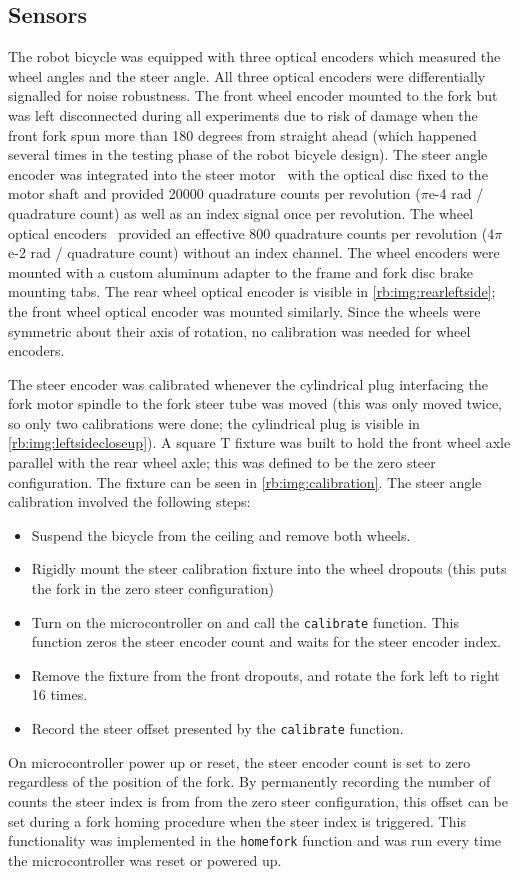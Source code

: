 \subsection{Sensors} \label{rb:subsec:sensors}
The robot bicycle was equipped with three optical encoders which measured the
wheel angles and the steer angle. All three optical encoders were
differentially signalled for noise robustness. The front wheel encoder mounted
to the fork but was left disconnected during all experiments due to risk of
damage when the front fork spun more than 180 degrees from straight ahead
(which happened several times in the testing phase of the robot bicycle
design). The steer angle encoder was integrated into the steer
motor~\cite{TeknicM3441} with the optical disc fixed to the motor shaft and
provided 20000 quadrature counts per revolution ($\pi$e-4 rad / quadrature
count) as well as an index signal once per revolution. The wheel optical
encoders~\cite{USDigitalH5} provided an effective 800 quadrature counts per
revolution ($4\pi$e-2 rad / quadrature count) without an index channel. The
wheel encoders were mounted with a custom aluminum adapter to the frame and
fork disc brake mounting tabs. The rear wheel optical encoder is visible in
\autoref{rb:img:rearleftside}; the front wheel optical encoder was mounted
similarly. Since the wheels were symmetric about their axis of rotation, no
calibration was needed for wheel encoders.

The steer encoder was calibrated whenever the cylindrical plug interfacing the
fork motor spindle to the fork steer tube was moved (this was only moved twice,
so only two calibrations were done; the cylindrical plug is visible in
\autoref{rb:img:leftsidecloseup}). A square T fixture was built to hold the
front wheel axle parallel with the rear wheel axle; this was defined to be the
zero steer configuration. The fixture can be seen in
\autoref{rb:img:calibration}. The steer angle calibration involved the
following steps:
\begin{itemize}
  \item Suspend the bicycle from the ceiling and remove both wheels.
  \item Rigidly mount the steer calibration fixture into the wheel dropouts
    (this puts the fork in the zero steer configuration)
  \item Turn on the microcontroller on and call the \verb|calibrate| function.
    This function zeros the steer encoder count and waits for the steer encoder
    index.
  \item Remove the fixture from the front dropouts, and rotate the fork left to
    right 16 times.
  \item Record the steer offset presented by the \verb|calibrate| function.
\end{itemize}
On microcontroller power up or reset, the steer encoder count is set to zero
regardless of the position of the fork. By permanently recording the number of
counts the steer index is from from the zero steer configuration, this offset
can be set during a fork homing procedure when the steer index is triggered.
This functionality was implemented in the \verb|homefork| function and was run
every time the microcontroller was reset or powered up.

